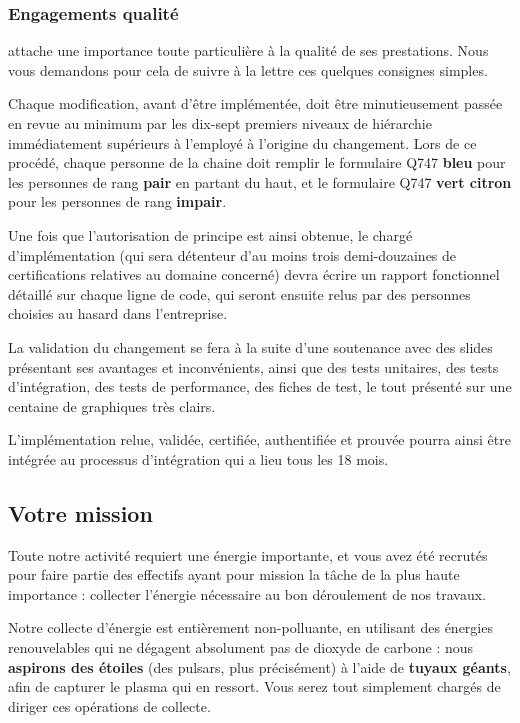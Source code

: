 \subsubsection{Engagements qualité}

\provogon{} attache une importance toute particulière à la qualité de ses
prestations. Nous vous demandons pour cela de suivre à la lettre ces quelques
consignes simples.

Chaque modification, avant d'être implémentée, doit être minutieusement passée
en revue au minimum par les dix-sept premiers niveaux de hiérarchie
immédiatement supérieurs à l'employé à l'origine du changement.  Lors de ce
procédé, chaque personne de la chaine doit remplir le formulaire Q747
\textbf{bleu} pour les personnes de rang \textbf{pair} en partant du haut, et
le formulaire Q747 \textbf{vert citron} pour les personnes de rang
\textbf{impair}.

Une fois que l'autorisation de principe est ainsi obtenue, le chargé
d'implémentation (qui sera détenteur d'au moins trois demi-douzaines de
certifications relatives au domaine concerné) devra écrire un rapport
fonctionnel détaillé sur chaque ligne de code, qui seront ensuite relus par des
personnes choisies au hasard dans l'entreprise.

La validation du changement se fera à la suite d'une soutenance avec des slides
présentant ses avantages et inconvénients, ainsi que des tests unitaires, des
tests d'intégration, des tests de performance, des fiches de test, le tout
présenté sur une centaine de graphiques très clairs.

L'implémentation relue, validée, certifiée, authentifiée et prouvée pourra
ainsi être intégrée au processus d'intégration qui a lieu tous les 18 mois.

\subsection{Votre mission}

Toute notre activité requiert une énergie importante, et vous avez été recrutés
pour faire partie des effectifs ayant pour mission la tâche de la plus haute
importance : collecter l'énergie nécessaire au bon déroulement de nos travaux.

Notre collecte d'énergie est entièrement non-polluante, en utilisant des
énergies renouvelables qui ne dégagent absolument pas de dioxyde de carbone :
nous \textbf{aspirons des étoiles} (des pulsars, plus précisément) à l'aide de
\textbf{tuyaux géants}, afin de capturer le plasma qui en ressort. Vous serez
tout simplement chargés de diriger ces opérations de collecte.

